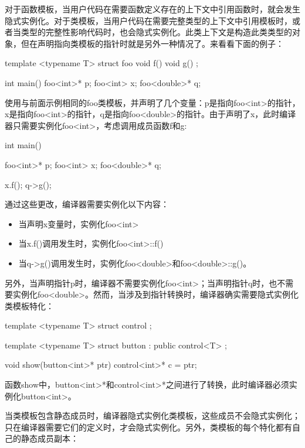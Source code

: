 对于函数模板，当用户代码在需要函数定义存在的上下文中引用函数时，就会发生隐式实例化。对于类模板，当用户代码在需要完整类型的上下文中引用模板时，或者当类型的完整性影响代码时，也会隐式实例化。此类上下文是构造此类类型的对象，但在声明指向类模板的指针时就是另外一种情况了。来看看下面的例子：

\begin{cpp}
template <typename T>
struct foo
{
	void f() {}
	void g() {}
};

int main()
{
	foo<int>* p;
	foo<int> x;
	foo<double>* q;
}
\end{cpp}

使用与前面示例相同的foo类模板，并声明了几个变量：p是指向foo<int>的指针，x是指向foo<int>的指针，q是指向foo<double>的指针。由于声明了x，此时编译器只需要实例化foo<int>，考虑调用成员函数f和g:

\begin{cpp}
int main()
{
	foo<int>* p;
	foo<int> x;
	foo<double>* q;
	
	x.f();
	q->g();
}
\end{cpp}

通过这些更改，编译器需要实例化以下内容：

\begin{itemize}
\item 
当声明x变量时，实例化foo<int>

\item 
当x.f()调用发生时，实例化foo<int>::f()

\item 
当q->g()调用发生时，实例化foo<double>和foo<double>::g()。
\end{itemize}

另外，当声明指针p时，编译器不需要实例化foo<int>；当声明指针q时，也不需要实例化foo<double>。然而，当涉及到指针转换时，编译器确实需要隐式实例化类模板特化：

\begin{cpp}
template <typename T>
struct control
{};

template <typename T>
struct button : public control<T>
{};

void show(button<int>* ptr)
{
	control<int>* c = ptr;
}
\end{cpp}

函数show中，button<int>*和control<int>*之间进行了转换，此时编译器必须实例化button<int>。

当类模板包含静态成员时，编译器隐式实例化类模板，这些成员不会隐式实例化；只在编译器需要它们的定义时，才会隐式实例化。另外，类模板的每个特化都有自己的静态成员副本：

